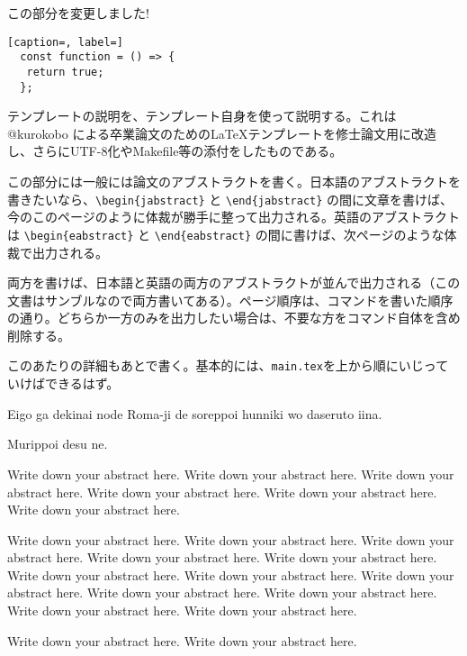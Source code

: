 


\begin{jabstract}

この部分を変更しました! \\

\begin{lstlisting}[caption=, label=]
  const function = () => {
   return true;
  };
\end{lstlisting}

テンプレートの説明を、テンプレート自身を使って説明する。これは @kurokobo による卒業論文のための\LaTeX テンプレートを修士論文用に改造し、さらにUTF-8化やMakefile等の添付をしたものである。

この部分には一般には論文のアブストラクトを書く。日本語のアブストラクトを書きたいなら、\verb|\begin{jabstract}| と \verb|\end{jabstract}| の間に文章を書けば、今のこのページのように体裁が勝手に整って出力される。英語のアブストラクトは \verb|\begin{eabstract}| と \verb|\end{eabstract}| の間に書けば、次ページのような体裁で出力される。

両方を書けば、日本語と英語の両方のアブストラクトが並んで出力される（この文書はサンブルなので両方書いてある）。ページ順序は、コマンドを書いた順序の通り。どちらか一方のみを出力したい場合は、不要な方をコマンド自体を含め削除する。

このあたりの詳細もあとで書く。基本的には、{\tt main.tex}を上から順にいじっていけばできるはず。

\end{jabstract}


\begin{eabstract}

Eigo ga dekinai node Roma-ji de soreppoi hunniki wo daseruto iina.

Murippoi desu ne.

Write down your abstract here. Write down your abstract here. Write down your abstract here. Write down your abstract here. Write down your abstract here. Write down your abstract here.

 Write down your abstract here. Write down your abstract here. Write down your abstract here. Write down your abstract here. Write down your abstract here. Write down your abstract here. Write down your abstract here. Write down your abstract here. Write down your abstract here. Write down your abstract here. Write down your abstract here. Write down your abstract here.

Write down your abstract here. Write down your abstract here.

\end{eabstract}
